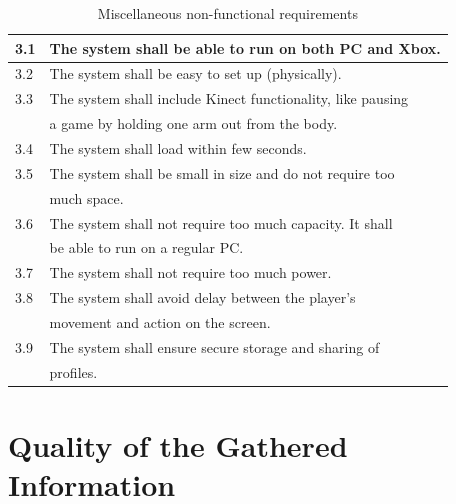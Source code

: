 \begin{table} [H]
\label{tab:nfunc2}
\centering
\begin{tabular}{|l|l|}
\hline
3.1 & The system shall be able to run on both PC and Xbox. \\ \hline
3.2 & The system shall be easy to set up (physically).\\ \hline
3.3 & The system shall include Kinect functionality, like pausing \\ & a game by holding one arm out from the body. \\ \hline
3.4 & The system shall load within few seconds.\\ \hline
3.5 & The system shall be small in size and do not require too \\&  much space.\\ \hline
3.6 & The system shall not require too much capacity. It shall \\ & be able to run on a regular PC. \\ \hline
3.7 & The system shall not require too much power. \\ \hline
3.8 & The system shall avoid delay between the player's \\ & movement and action on the screen.\\ \hline
3.9 & The system shall ensure secure storage and sharing of \\ & profiles. \\ \hline
\end{tabular}
\caption[Miscellaneous non-functional requirements]{Miscellaneous non-functional requirements}
\end{table} 

\section{Quality of the Gathered Information}
\label{sec:discQuality}